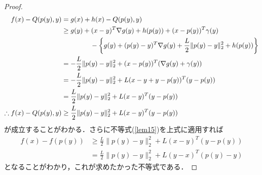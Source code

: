 \documentclass{jsarticle}
\theoremstyle{definition}
\theoremstyle{mystyle} %
\begin{document}
\begin{proof}
\begin{align*}
f(x)-Q(p(y),y)&=g(x)+h(x)-Q(p(y),y)\\
&\geq g(y)+(x-y)^T\nabla g(y)+h(p(y))+(x-p(y))^T\gamma(y)\\
&\hspace{1.5cm}-\left\{g(y) +(p(y)-y)^T \nabla g(y)+\frac{L}{2}\|p(y)-y\|_2^2+h(p(y))\right\}\\
&=-\frac{L}{2}\|p(y)-y\|_2^2+(x-p(y))^T(\nabla g(y)+\gamma (y))\\
&=-\frac{L}{2}\|p(y)-y\|_2^2+L(x-y+y-p(y))^T(y-p(y))\\
&=\frac{L}{2}\|p(y)-y\|_2^2+L(x-y)^T(y-p(y))\\
\therefore f(x)-Q(p(y),y)&\geq \frac{L}{2}\|p(y)-y\|_2^2+L(x-y)^T(y-p(y))
\end{align*}
が成立することがわかる．さらに不等式(\ref{lem15})を上式に適用すれば
\begin{align*}
f(x)-f(p(y))&\geq \frac{L}{2}\|p(y)-y\|_2^2+L(x-y)^T(y-p(y))\\
&=\frac{L}{2}\|p(y)-y\|_2^2+L(y-x)^T(p(y)-y)
\end{align*}
となることがわかり，これが求めたかった不等式である．
\end{proof}
\end{document}
